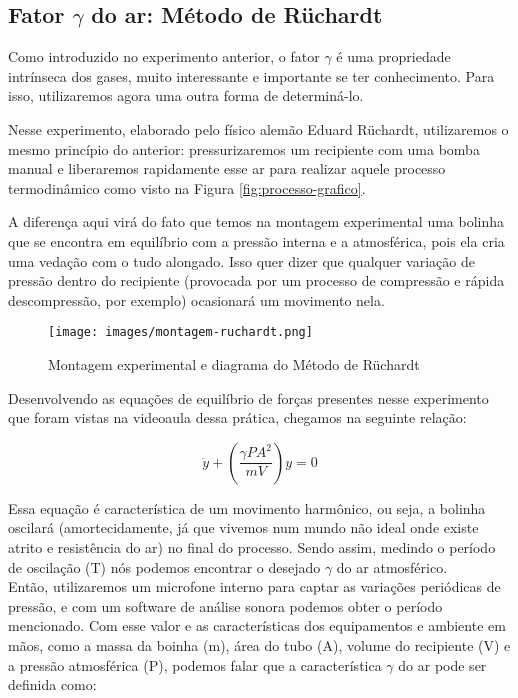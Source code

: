 \subsection{Fator $\gamma$ do ar: Método de Rüchardt}

Como introduzido no experimento anterior, o fator $\gamma$ é uma propriedade intrínseca dos gases, muito interessante e importante se ter conhecimento. Para isso, utilizaremos agora uma outra forma de determiná-lo.

Nesse experimento, elaborado pelo físico alemão Eduard Rüchardt, utilizaremos o mesmo princípio do anterior: pressurizaremos um recipiente com uma bomba manual e liberaremos rapidamente esse ar para realizar aquele processo termodinâmico como visto na Figura \ref{fig:processo-grafico}.

A diferença aqui virá do fato que temos na montagem experimental uma bolinha que se encontra em equilíbrio com a pressão interna e a atmosférica, pois ela cria uma vedação com o tudo alongado. Isso quer dizer que qualquer variação de pressão dentro do recipiente (provocada por um processo de compressão e rápida descompressão, por exemplo) ocasionará um movimento nela.

\begin{figure}[H]
  \centering
  \texttt{[image: images/montagem-ruchardt.png]}
  \caption{Montagem experimental e diagrama do Método de Rüchardt}
\end{figure}

Desenvolvendo as equações de equilíbrio de forças presentes nesse experimento que foram vistas na videoaula dessa prática, chegamos na seguinte relação:

\[ \ddot{y} + \left( \frac{\gamma P A^2}{m V} \right) y = 0 \]

Essa equação é característica de um movimento harmônico, ou seja, a bolinha oscilará (amortecidamente, já que vivemos num mundo não ideal onde existe atrito e resistência do ar) no final do processo. Sendo assim, medindo o período de oscilação (T) nós podemos encontrar o desejado $\gamma$ do ar atmosférico.\\

Então, utilizaremos um microfone interno para captar as variações periódicas de pressão, e com um software de análise sonora podemos obter o período mencionado. Com esse valor e as características dos equipamentos e ambiente em mãos, como a massa da boinha (m), área do tubo (A), volume do recipiente (V) e a pressão atmosférica (P), podemos falar que a característica $\gamma$ do ar pode ser definida como:

